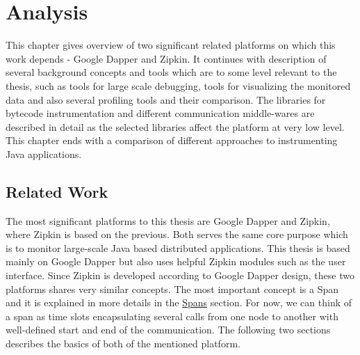 \chapter{Analysis}
This chapter gives overview of two significant related platforms on which this work depends - Google Dapper and Zipkin. It continues with description of several background concepts and tools which are to some level relevant to the thesis, such as tools for large scale debugging, tools for visualizing the monitored data and also several profiling tools and their comparison. The libraries for bytecode instrumentation and different communication middle-wares are described in detail as the selected libraries affect the platform at very low level. This chapter ends with a comparison of different approaches to instrumenting Java applications.
\section{Related Work}
The most significant platforms to this thesis are Google Dapper and Zipkin, where Zipkin is based on the previous. Both serves the same core purpose which is to monitor large-scale Java based distributed applications. This thesis is based mainly on Google Dapper but also uses helpful Zipkin modules such as the user interface. Since Zipkin is developed according to Google Dapper design, these two platforms shares very similar concepts. The most important concept is a Span and it is explained in more details in the  \hyperref[subsec:Spans]{Spans} section. For now, we can think of a span as time slots encapsulating several calls from one node to another with well-defined start and end of the communication. The following two sections describes the basics of both of the mentioned platform.
